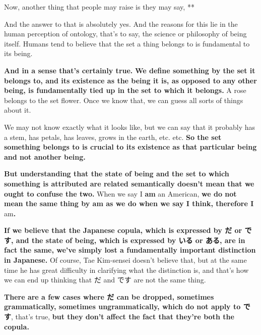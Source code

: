 \stopsectionlevel

\startsectionlevel[title={Copula vs state of being},reference={copula-vs-state-of-being}]

Now, another thing that people may raise is they may say, **

{}

And the answer to that is absolutely yes. And the reasons for this lie in the human perception of ontology, that's to say, the science or philosophy of being itself. Humans tend to believe that the set a thing belongs to is fundamental to its being.

{\bf And in a sense that's certainly true.} {\bf We define something by the set it belongs to, and its existence as the being it is, as opposed to any other being, is fundamentally tied up in the set to which it belongs.} A rose belongs to the set flower. Once we know that, we can guess all sorts of things about it.

We may not know exactly what it looks like, but we can say that it probably has a stem, has petals, has leaves, grows in the earth, etc. etc. {\bf So the set something belongs to is crucial to its existence as that particular being and not another being.}

\thinrule

{\bf But understanding that the state of being and the set to which something is attributed are related semantically doesn't mean that we ought to confuse the two.} When we say I {\bf am} an American, {\bf we do not mean the same thing by am as we do when we say I think, therefore I }am{\bf .}

{\bf If we believe that the Japanese copula, which is expressed by だ or です, and the state of being, which is expressed by いる or ある, are in fact the same, we've simply lost a fundamentally important distinction in Japanese.} Of course, Tae Kim-sensei doesn't believe that, but at the same time he has great difficulty in clarifying what the distinction is, and that's how we can end up thinking that だ and です are not the same thing.

{\bf There are a few cases where だ can be dropped, sometimes grammatically, sometimes ungrammatically, which do not apply to です}, that's true, {\bf but they don't affect the fact that they're both the copula.}

